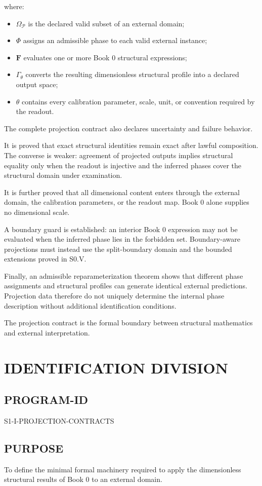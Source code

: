 \documentclass[11pt,oneside,openany]{book}
\newcommand{\PCsection}[1]{%
  \section*{#1}\addcontentsline{toc}{section}{#1}%
}
\newcommand{\PCsubsection}[1]{%
  \subsection*{#1}%
}
\begin{document}
where:

\begin{itemize}
\item \(\Omega_{\mathcal P}\) is the declared valid subset of an external domain;
\item \(\Phi\) assigns an admissible phase to each valid external instance;
\item \(\mathbf F\) evaluates one or more Book 0 structural expressions;
\item \(\Gamma_\theta\) converts the resulting dimensionless structural profile into a declared output space;
\item \(\theta\) contains every calibration parameter, scale, unit, or convention required by the readout.
\end{itemize}
The complete projection contract also declares uncertainty and failure behavior.

It is proved that exact structural identities remain exact after lawful composition. The converse is weaker: agreement of projected outputs implies structural equality only when the readout is injective and the inferred phases cover the structural domain under examination.

It is further proved that all dimensional content enters through the external domain, the calibration parameters, or the readout map. Book 0 alone supplies no dimensional scale.

A boundary guard is established: an interior Book 0 expression may not be evaluated when the inferred phase lies in the forbidden set. Boundary-aware projections must instead use the split-boundary domain and the bounded extensions proved in S0.V.

Finally, an admissible reparameterization theorem shows that different phase assignments and structural profiles can generate identical external predictions. Projection data therefore do not uniquely determine the internal phase description without additional identification conditions.

The projection contract is the formal boundary between structural mathematics and external interpretation.


\PCsection{IDENTIFICATION DIVISION}

\PCsubsection{PROGRAM-ID}

S1-I-PROJECTION-CONTRACTS

\PCsubsection{PURPOSE}

To define the minimal formal machinery required to apply the dimensionless structural results of Book 0 to an external domain.
\end{document}
